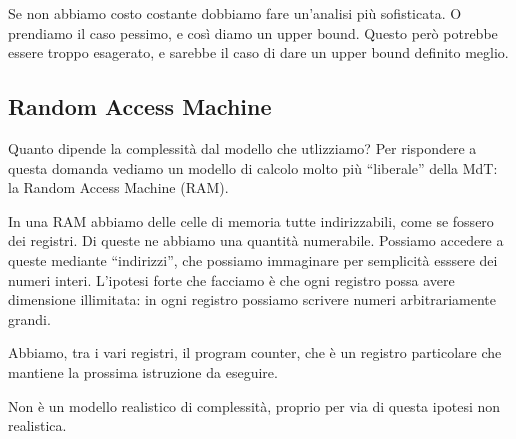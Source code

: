 Se non abbiamo costo costante dobbiamo fare un'analisi più sofisticata. O prendiamo il caso
pessimo, e così diamo un upper bound. Questo però potrebbe essere troppo esagerato, e sarebbe il
caso di dare un upper bound definito meglio.

\subsection{Random Access Machine}

Quanto dipende la complessità dal modello che utlizziamo? Per rispondere a questa domanda vediamo
un modello di calcolo molto più ``liberale'' della MdT: la Random Access Machine (RAM).

In una RAM abbiamo delle celle di memoria tutte indirizzabili, come se fossero dei registri. Di
queste ne abbiamo una quantità numerabile. Possiamo accedere a queste mediante ``indirizzi'', che
possiamo immaginare per semplicità esssere dei numeri interi. L'ipotesi forte che facciamo è che
ogni registro possa avere dimensione illimitata: in ogni registro possiamo scrivere numeri
arbitrariamente grandi.

Abbiamo, tra i vari registri, il program counter, che è un registro particolare che mantiene la
prossima istruzione da eseguire.

Non è un modello realistico di complessità, proprio per via di questa ipotesi non realistica.

